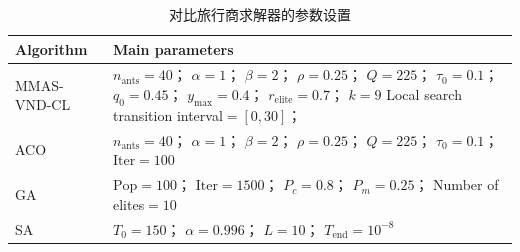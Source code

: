 \documentclass[lettersize,journal]{IEEEtran}
\begin{document}
\begin{table}[!t]
\caption{对比旅行商求解器的参数设置}
\label{tab:tsp_params}
\centering
\scriptsize
\begin{tabular}{>{\centering\arraybackslash}m{} m{}}
\toprule
Algorithm & Main parameters \\
\midrule
MMAS-VND-CL & $n_{\mathrm{ants}}=40$；
$\alpha=1$；
$\beta=2$；\newline
$\rho=0.25$；
$Q=225$；
$\tau_0=0.1$；\newline
$q_0=0.45$；
$y_{\max}=0.4$；\newline
$r_{\mathrm{elite}}=0.7$；
$k=9$ \newline
Local search transition interval$=[0,30]$；\\
\midrule
ACO & $n_{\mathrm{ants}}=40$；
$\alpha=1$；
$\beta=2$；
$\rho=0.25$；\newline
$Q=225$；
$\tau_0=0.1$；
$\mathrm{Iter}=100$ \\
\midrule
GA & $\mathrm{Pop}=100$；
$\mathrm{Iter}=1500$；\newline
$P_c=0.8$；
$P_m=0.25$；\newline
Number of elites$=10$ \\
\midrule
SA & $T_0=150$；
$\alpha=0.996$；\newline
$L=10$；
$T_{\mathrm{end}}=10^{-8}$ \\
\bottomrule
\end{tabular}
\end{table}
\end{document}
